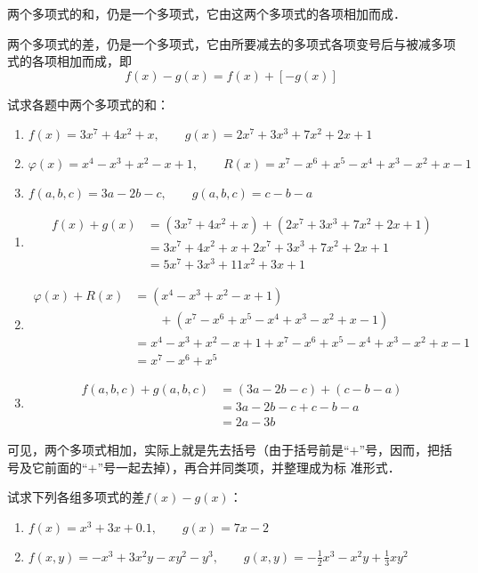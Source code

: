 两个多项式的和，仍是一个多项式，它由这两个多项式的各项相加而成．

两个多项式的差，仍是一个多项式，它由所要减去的多项式各项变号后与被减多项式的各项相加而成，即 
\[f(x)-g(x)=f(x)+[-g(x)]\]

\begin{example}
    试求各题中两个多项式的和：
\begin{enumerate}
    \item $f(x)=3x^7+4x^2+x,\qquad g(x)=2x^7+3x^3+7x^2+2x+1$
    \item $\varphi(x)=x^4-x^3+x^2-x+1,\qquad R(x)=x^7-x^6+x^5-x^4+x^3-x^2+x-1$
    \item $f(a,b,c)=3a-2b-c,\qquad g(a,b,c)=c-b-a$
\end{enumerate}

\end{example}

\begin{solution}
\begin{enumerate}
    \item \[\begin{split}
        f(x)+g(x)&=(3x^7+4x^2+x)+(2x^7+3x^3+7x^2+2x+1)\\
        &=3x^7+4x^2+x+2x^7+3x^3+7x^2+2x+1\\
&=5x^7+3x^3+11x^2+3x+1
    \end{split}\]
    \item \[\begin{split}
        \varphi(x)+R(x)&=(x^4-x^3+x^2-x+1)\\
        &\qquad +(x^7-x^6+x^5-x^4+x^3-x^2+x-1)\\
        &=x^4-x^3+x^2-x+1+x^7-x^6+x^5-x^4+x^3-x^2+x-1\\
        &=x^7-x^6+x^5
    \end{split}\]
    \item \[\begin{split}
        f(a,b,c)+g(a,b,c)&=(3a-2b-c)+(c-b-a)\\
        &=3a-2b-c+c-b-a\\
&=2a-3b        
    \end{split}\]
\end{enumerate}    
\end{solution}

可见，两个多项式相加，实际上就是先去括号（由于括号前是“$+$”号，因而，把括号及它前面的“$+$”号一起去掉），再合并同类项，并整理成为标
准形式．


\begin{example}
    试求下列各组多项式的差$f(x)-g(x)$：
    \begin{enumerate}
        \item $f(x)=x^3+3x+0.1,\qquad g(x)=7x-2$
        \item $f(x,y)=-x^3+3x^2y-xy^2-y^3,\qquad g(x,y)=-\frac{1}{2}x^3-x^2y+\frac{1}{3}xy^2$
    \end{enumerate}
\end{example}

